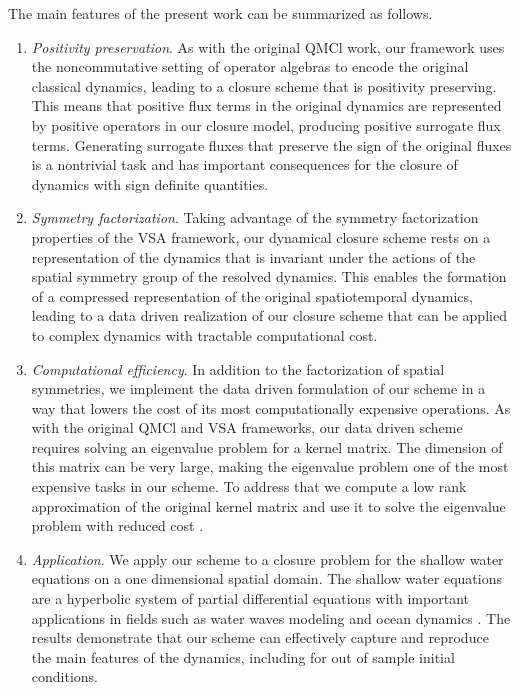 \documentclass[letterpaper,10pt,3p,preprint]{elsarticle}
\begin{document}
The main features of the present work can be summarized as follows.
\begin{enumerate}
\item \emph{Positivity preservation}.
As with the original QMCl work, our framework uses the
noncommutative setting of operator algebras to encode the
original classical dynamics, leading to a closure scheme
that is positivity preserving.
This means that positive flux terms in the original
dynamics are represented by positive operators in
our closure model, producing positive surrogate
flux terms.
Generating surrogate fluxes that preserve the sign of the
original fluxes is a nontrivial task and has important
consequences for the closure of dynamics with sign definite
quantities.
\item \emph{Symmetry factorization}.
Taking advantage of the symmetry factorization properties
of the VSA framework, our dynamical closure scheme rests on
a representation of the dynamics that is invariant under the
actions of the spatial symmetry group of the resolved dynamics.
This enables the formation of a compressed representation
of the original spatiotemporal dynamics, leading to a data driven
realization of our closure scheme that can be applied to
complex dynamics with tractable computational cost.
\item \emph{Computational efficiency}.
In addition to the factorization of spatial symmetries,
we implement the data driven formulation of our scheme in a
way that lowers the cost of its most computationally expensive
operations.
As with the original QMCl and VSA frameworks, our data driven
scheme requires solving an eigenvalue problem for a kernel
matrix.
The dimension of this matrix can be very large, making the
eigenvalue problem one of the most expensive tasks in
our scheme.
To address that we compute a low rank approximation
of the original kernel matrix and use it to solve the
eigenvalue problem with reduced cost
\cite{YChen2024,Vales2025evd}.
\item \emph{Application}. We apply our scheme to a closure
problem for the shallow water equations on a one dimensional
spatial domain.
The shallow water equations are a hyperbolic system of partial
differential equations with important applications in fields
such as water waves modeling and ocean dynamics
\cite{Vallis2017,Whitham1999}.
The results demonstrate that our scheme can effectively capture
and reproduce the main features of the dynamics,
including for out of sample initial conditions.
\end{enumerate}
\end{document}
